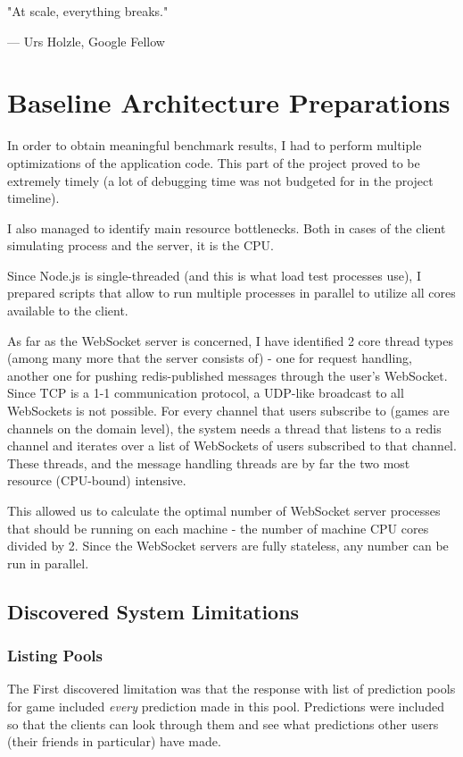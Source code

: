 \documentclass{uvamscse}
\begin{document}
\epigraph{"At scale, everything breaks."}{--- Urs Holzle, Google Fellow}

\section{Baseline Architecture Preparations}\label{Baseline Architecture Preparations}
In order to obtain meaningful benchmark results, I had to perform multiple optimizations of the application code. This part of the project proved to be extremely timely (a lot of debugging time was not budgeted for in the project timeline).

I also managed to identify main resource bottlenecks. Both in cases of the client simulating process and the server, it is the CPU.

Since Node.js is single-threaded (and this is what load test processes use), I prepared scripts that allow to run multiple processes in parallel to utilize all cores available to the client.

As far as the WebSocket server is concerned, I have identified 2 core thread types (among many more that the server consists of) - one for request handling, another one for pushing redis-published messages through the user's WebSocket. Since TCP is a 1-1 communication protocol, a UDP-like broadcast to all WebSockets is not possible. For every channel that users subscribe to (games are channels on the domain level), the system needs a thread that listens to a redis channel and iterates over a list of WebSockets of users subscribed to that channel. These threads, and the message handling threads are by far the two most resource (CPU-bound) intensive.

This allowed us to calculate the optimal number of WebSocket server processes that should be running on each machine - the number of machine CPU cores divided by 2. Since the WebSocket servers are fully stateless, any number can be run in parallel.

\subsection{Discovered System Limitations}\label{Discovered System Limitations}

\subsubsection{Listing Pools}
The First discovered limitation was that the response with list of prediction pools for game included \textit{every} prediction made in this pool. Predictions were included so that the clients can look through them and see what predictions other users (their friends in particular) have made.
\end{document}
